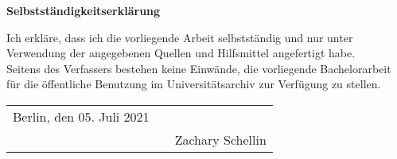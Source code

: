 \begin{center}
{\sffamily \bfseries\Large Selbstständigkeitserklärung}\\
\end{center}%
\vspace{1cm}
%
Ich erkläre, dass ich die vorliegende Arbeit selbstständig und nur unter Verwendung der angegebenen Quellen und Hilfsmittel angefertigt habe.\\[0.2cm]
\noindent Seitens des Verfassers bestehen keine Einwände, die vorliegende Bachelorarbeit für die öffentliche Benutzung im Universitätsarchiv zur Verfügung zu stellen.\\[2cm]

\hspace{-1cm}
\begin{tabular}{p{5.5cm}p{2.5cm}c}
Berlin, den 05. Juli 2021   && \hrulefill\\%
     && \hspace{1cm}Zachary Schellin \hspace{1cm}
\end{tabular} 